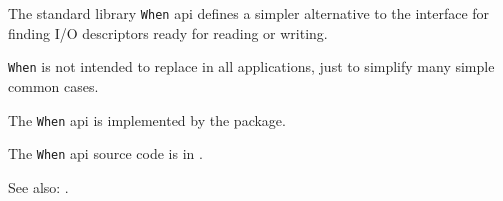 
The standard library {\tt When} api defines a simpler alternative to 
the  interface for finding I/O descriptors 
ready for reading or writing.

{\tt When} is not intended to replace 
 in all applications, just to simplify 
many simple common cases.

The {\tt When} api is implemented by the  package.

The {\tt When} api source code is in .

See also:  .